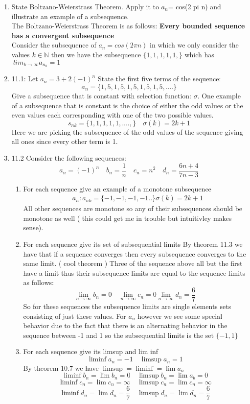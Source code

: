 \documentclass[11pt]{article}
\theoremstyle{definition}  %
\newcommand{\nlim}{\lim_{n\rightarrow \infty}}
\begin{document}
\begin{enumerate}
\begin{proof}
  \end{proof}
  \item State Boltzano-Weierstrass Theorem. Apply it to $a_n$= cos(2 pi n) and illustrate an example of a subsequence.\\
  The Boltzano-Weierstrass Theorem is as follows:
  \textbf{Every bounded sequence has a convergent subsequence}\\
  Consider the subsequence of $a_n=cos(2\pi n)$ in which we only consider the values $k\in \mathbb{N}$ then we have the subsequence $\{1,1,1,1,1,\}$ which has $\
  lim_{k\rightarrow \infty}a_n_k=1$
  \item 11.1: Let $a_n=3+2(-1)^n$
  State the first five terms of the sequence:
  \[
    a_n=\{1,5,1,5,1,5,1,5,1,5,....\}
  \]
  Give a subsequence that is constant with selection function: $\sigma$. One example of a subsequence that is constant is the choice of either the odd values or the even values each corresponding with one of the two possible values.
  \[
    s_{nk}=\{1,1,1,1,1,....,\} \quad \sigma(k)=2k+1
  \]
  Here we are picking the subsequence of the odd values of the sequence giving all ones since every other term is 1.
  \item 11.2  Consider the following sequences:
  \[
    a_n=(-1)^n\quad b_n=\frac{1}{n} \quad c_n=n^2\quad d_n=\frac{6n+4}{7n-3}
  \]
  \begin{enumerate}
    \item For each sequence give an example of a monotone subsequence
    \begin{align*}
      &a_n: a_{nk}=\{-1,-1,-1,-1..\} \sigma(k)=2k+1
    \end{align*}
    All other sequences are monotone so any of their subsequences should be monotone as well ( this could get me in trouble but intuitivley makes sense).
    \item For each sequence give its set of subsequential limits
    By theorem 11.3 we have that if a sequence converges then every subsequence converges to the same limit. ( cool theorem ) Three of the sequence above all but the first have a limit thus their subsequence limits are equal to the sequence limits as follows:
    \[
      \nlim b_n=0\quad \nlim c_n=0\nlim d_n=\frac{6}{7}
    \]
    So for these sequences the subsequence limits are single elements sets consisting of just these values. For $a_n$ however we see some special behavior due to the fact that there is an alternating behavior in the sequence between -1 and 1 so the subsequential limits is the set $\{-1,1\}$
    \item For each sequence give its limsup and lim inf
    \[
      \liminf a_n=-1 \quad \limsup a_n=1
    \]
    By theorem 10.7 we have $\limsup=\liminf=\lim a_n$
    \[
      \liminf b_n=\lim b_n=0 \quad \limsup b_n=\lim a_b=0
    \]
    \[
      \liminf c_n=\lim c_n=\infty \quad \limsup c_n=\lim c_n=\infty
    \]
    \[
      \liminf d_n=\lim d_n=\frac{6}{7} \quad \limsup d_n=\lim d_n=\frac{6}{7}
    \]


\end{enumerate}
\end{enumerate}
\end{document}
